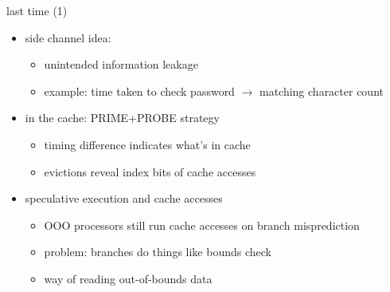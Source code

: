 \date{}
\title{}
\date{}

\begin{frame}
    \titlepage
\end{frame}



\begin{frame}{last time (1)}
    \begin{itemize}
    \item side channel idea:
        \begin{itemize}
        \item unintended information leakage
        \item example: time taken to check password $\rightarrow$ matching character count
        \end{itemize}
    \item in the cache: PRIME+PROBE strategy
        \begin{itemize}
        \item timing difference indicates what's in cache
        \item evictions reveal index bits of cache accesses
        \end{itemize}
    \item speculative execution and cache accesses
        \begin{itemize}
        \item OOO processors still run cache accesses on branch misprediction
        \item problem: branches do things like bounds check
        \item way of reading out-of-bounds data
        \end{itemize}
    \end{itemize}
\end{frame}

